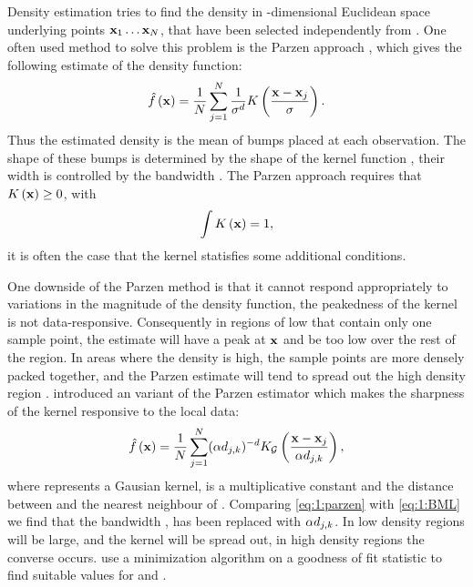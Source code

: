 Density estimation tries to find the density \varDensityFunction{\varPattern} in \varDim-dimensional Euclidean space underlying \varNumPatterns points $\varPattern[1] \dotsc \varPattern[\varNumPatterns]$, that have been selected independently from \varDensityFunction{\varPattern}. One often used method to solve this problem is the Parzen approach \cite{parzen1962estimation}, which gives the following estimate of the density function:
%
\begin{equation}\label{eq:1:parzen}
	\varEstimatedDensityFunction{\varPattern} = \frac{1}{\varNumPatterns}\sum_{j = 1}^{\varNumPatterns} \frac{1}{\varBandwidth^\varDim}\varKernel{\frac{\varPattern - \varPattern[j]}{\varBandwidth}}.
\end{equation}
%
Thus the estimated density is the mean of bumps placed at each observation. The shape of these bumps is determined by the shape of the kernel function \varKernel{\cdot}, their width is controlled by the bandwidth \varBandwidth \cite{silverman1986density}. The Parzen approach requires that $\varKernel{\varPattern} \geq 0$, with
% 
\begin{equation}\label{eq:1:kernelRequirement}
	\int \varKernel{\varPattern} = 1,
\end{equation}
it is often the case that the kernel statisfies some additional conditions. 

One downside of the Parzen method is that it cannot respond appropriately to variations in the magnitude of the density function, \ie the peakedness of the kernel is not data-responsive. Consequently in regions of low \varDensityFunction{\varPattern} that contain only one sample point, the estimate will have a peak at $\varPattern$ and be too low over the rest of the region. In areas where the density is high, the sample points are more densely packed together, and the Parzen estimate will tend to spread out the high density region \cite{breiman1977variable}. \citeauthor{breiman1977variable} introduced an variant of the Parzen estimator which makes the sharpness of the kernel responsive to the local data: 
\begin{equation}\label{eq:1:BML}
 	\varEstimatedDensityFunction{\varPattern} = \frac{1}{\varNumPatterns} \sum_{j = 1}^{\varNumPatterns} (\varBMLconstant \varKNNDistance{j}{k})^{-\varDim} \varKernel[\varGaussian]{\frac{\varPattern - \varPattern[j]}{\varBMLconstant \varKNNDistance{j}{k}}},
\end{equation} 
%
where \varKernel[\varGaussian]{\cdot} represents a Gausian kernel, \varBMLconstant is a multiplicative constant and  the distance between \varPattern[j] and the \KNNK nearest neighbour of \varPattern[j]. Comparing \cref{eq:1:parzen} with \eqref{eq:1:BML} we find that the bandwidth \varBandwidth, has been replaced with $\alpha d_{j, k}$.  In low density regions  will be large, and the kernel will be spread out, in high density regions the converse occurs. \citeauthor{breiman1977variable} use a minimization algorithm on a goodness of fit statistic to find suitable values for \KNNK and \varBMLconstant.

